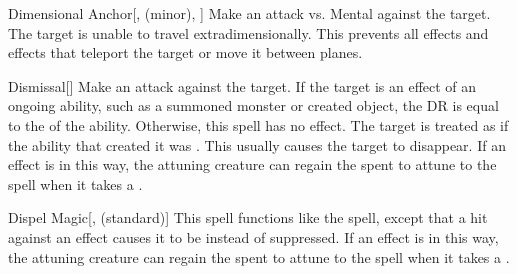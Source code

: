 \lowercase{\hypertarget{spell:Dimensional Anchor}{}}\label{spell:Dimensional Anchor}
\begin{freeability}[\nth{2}]{\hypertarget{spell:Dimensional Anchor}{Dimensional Anchor}}[,  (minor), ]
Make an attack vs. Mental against the target.
\hit The target is unable to travel extradimensionally.
This prevents all  effects and effects that teleport the target or move it between planes.
\end{freeability}
\vspace{0.25em}



\lowercase{\hypertarget{spell:Dismissal}{}}\label{spell:Dismissal}
\begin{freeability}[\nth{2}]{\hypertarget{spell:Dismissal}{Dismissal}}[]
Make an attack against the target.
If the target is an effect of an ongoing  ability, such as a summoned monster or created object, the DR is equal to the  of the ability.
Otherwise, this spell has no effect.
\hit The target is treated as if the ability that created it was .
This usually causes the target to disappear.
If an  effect is  in this way,
the attuning creature can regain the  spent to attune to the spell when it takes a .
\end{freeability}
\vspace{0.25em}



\lowercase{\hypertarget{spell:Dispel Magic}{}}\label{spell:Dispel Magic}
\begin{freeability}[\nth{2}]{\hypertarget{spell:Dispel Magic}{Dispel Magic}}[,  (standard)]
This spell functions like the  spell, except that a hit against an effect causes it to be  instead of suppressed.
If an  effect is  in this way,
the attuning creature can regain the  spent to attune to the spell when it takes a .
\end{freeability}
\vspace{0.25em}



